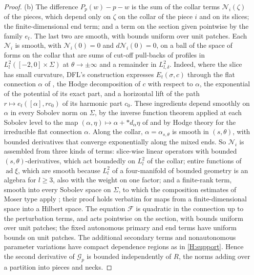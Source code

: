 \documentclass[11pt]{amsart}
\theoremstyle{definition}
\theoremstyle{remark}
\theoremstyle{plain}
\numberwithin{equation}{section}
\newcommand{\ad}{\operatorname{ad}}
\begin{document}
\begin{proof}
(b) The difference $P_p(w)-p-w$ is the sum of the collar terms $\mathcal N_i(\zeta)$
of the pieces, which depend only on $\zeta$ on the collar of the piece $i$ and
on its slices; the finite-dimensional end term; and a term on the section given
pointwise by the family $e_t$. The last two are smooth, with bounds uniform
over unit patches. Each $\mathcal N_i$ is smooth, with $\mathcal N_i(0)=0$ and
$d\mathcal N_i(0)=0$, on a ball of the space of forms on the collar that are
sums of cut-off pull-backs of profiles in $L^2_l([-2,0]\times\Sigma)$ at
$\theta\to\pm\infty$ and a remainder in $L^2_{l,\delta}$. Indeed, where the slice
has small curvature, DFL's construction expresses $E_t(\sigma,c)$ through the
flat connection $\alpha$ of \cite[Lemma~4.2]{DFL}, the Hodge decomposition of
$c$ with respect to $\alpha$, the exponential of the potential of its exact
part, and a horizontal lift of the path $r\mapsto e_t([\alpha],rc_0)$ of its
harmonic part $c_0$. These ingredients depend smoothly on $\alpha$ in every
Sobolev norm on $\Sigma$, by the inverse function theorem applied at each
Sobolev level to the map $(\alpha,\eta)\mapsto\alpha+{*}d_\alpha\eta$ of
\cite[Lemma~4.2]{DFL} and by Hodge theory for the irreducible flat connection
$\alpha$. Along the collar, $\alpha=\alpha_{s,\theta}$ is smooth in $(s,\theta)$,
with bounded derivatives that converge exponentially along the mixed ends. So
$\mathcal N_i$ is assembled from three kinds of terms: slice-wise linear operators
with bounded $(s,\theta)$-derivatives, which act boundedly on $L^2_l$ of the
collar; entire functions of $\ad\xi$, which are smooth because $L^2_l$ of a
four-manifold of bounded geometry is an algebra for $l\ge3$, also with the
weight on one factor; and a finite-rank term, smooth into every Sobolev space
on $\Sigma$, to which the composition estimates of Moser type apply
\cite[Chapter~13, Proposition~3.9]{Taylor-PDE3}; their proof holds verbatim for
maps from a finite-dimensional space into a Hilbert space. The equation
$\mathcal F$ is quadratic in the connection up to the perturbation terms, and
acts pointwise on the section, with bounds uniform over unit patches; the
fixed autonomous primary and end terms have uniform bounds on unit
patches. The additional secondary terms and nonautonomous parameter
variations have compact dependence regions as in \ref{H:support}. Hence the
second derivative of $\mathcal G_p$ is bounded independently of $R$, the norms
adding over a partition into pieces and necks.


\end{proof}
\end{document}
